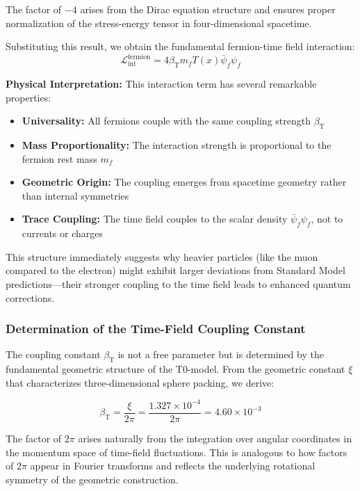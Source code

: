 \documentclass[12pt,a4paper]{article}
\newcommand{\Tfield}{T(x)}
\newcommand{\betaT}{\beta_{\text{T}}}
\newcommand{\xipar}{\xi}
\begin{document}
	The factor of $-4$ arises from the Dirac equation structure and ensures proper normalization of the stress-energy tensor in four-dimensional spacetime.
	
	Substituting this result, we obtain the fundamental fermion-time field interaction:
	\begin{equation}
		\mathcal{L}_{\text{int}}^{\text{fermion}} = 4\betaT m_f \Tfield \bar{\psi}_f \psi_f
	\end{equation}
	
	\textbf{Physical Interpretation:} This interaction term has several remarkable properties:
	\begin{itemize}
		\item \textbf{Universality:} All fermions couple with the same coupling strength $\betaT$
		\item \textbf{Mass Proportionality:} The interaction strength is proportional to the fermion rest mass $m_f$
		\item \textbf{Geometric Origin:} The coupling emerges from spacetime geometry rather than internal symmetries
		\item \textbf{Trace Coupling:} The time field couples to the scalar density $\bar{\psi}_f \psi_f$, not to currents or charges
	\end{itemize}
	
	This structure immediately suggests why heavier particles (like the muon compared to the electron) might exhibit larger deviations from Standard Model predictions—their stronger coupling to the time field leads to enhanced quantum corrections.
	
	\subsubsection{Determination of the Time-Field Coupling Constant}
	
	The coupling constant $\betaT$ is not a free parameter but is determined by the fundamental geometric structure of the T0-model. From the geometric constant $\xipar$ that characterizes three-dimensional sphere packing, we derive:
	
	\begin{equation}
		\betaT = \frac{\xipar}{2\pi} = \frac{1.327 \times 10^{-4}}{2\pi} = 4.60 \times 10^{-3}
	\end{equation}
	
	The factor of $2\pi$ arises naturally from the integration over angular coordinates in the momentum space of time-field fluctuations. This is analogous to how factors of $2\pi$ appear in Fourier transforms and reflects the underlying rotational symmetry of the geometric construction.
	
\end{document}
